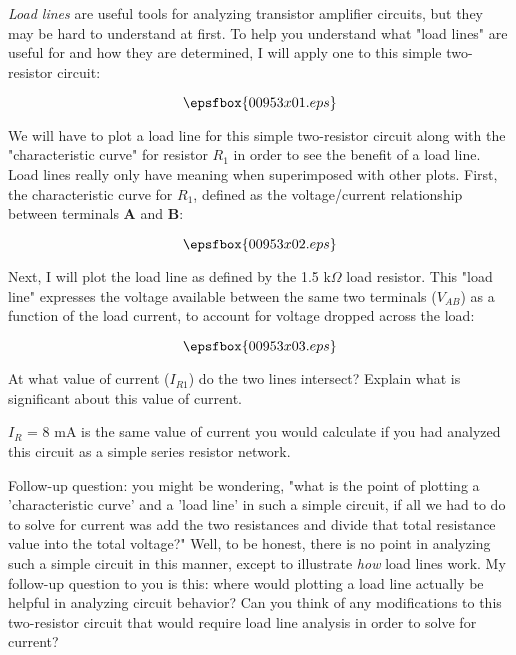 

{\it Load lines} are useful tools for analyzing transistor amplifier circuits, but they may be hard to understand at first.  To help you understand what "load lines" are useful for and how they are determined, I will apply one to this simple two-resistor circuit:

$$\epsfbox{00953x01.eps}$$

We will have to plot a load line for this simple two-resistor circuit along with the "characteristic curve" for resistor $R_1$ in order to see the benefit of a load line.  Load lines really only have meaning when superimposed with other plots.  First, the characteristic curve for $R_1$, defined as the voltage/current relationship between terminals {\bf A} and {\bf B}:

$$\epsfbox{00953x02.eps}$$

Next, I will plot the load line as defined by the 1.5 k$\Omega$ load resistor.  This "load line" expresses the voltage available between the same two terminals ($V_{AB}$) as a function of the load current, to account for voltage dropped across the load:

$$\epsfbox{00953x03.eps}$$

At what value of current ($I_{R1}$) do the two lines intersect?  Explain what is significant about this value of current.







$I_R$ = 8 mA is the same value of current you would calculate if you had analyzed this circuit as a simple series resistor network.

\vskip 10pt

Follow-up question: you might be wondering, "what is the point of plotting a 'characteristic curve' and a 'load line' in such a simple circuit, if all we had to do to solve for current was add the two resistances and divide that total resistance value into the total voltage?"  Well, to be honest, there is no point in analyzing such a simple circuit in this manner, except to illustrate {\it how} load lines work.  My follow-up question to you is this: where would plotting a load line actually be helpful in analyzing circuit behavior?  Can you think of any modifications to this two-resistor circuit that would require load line analysis in order to solve for current?

